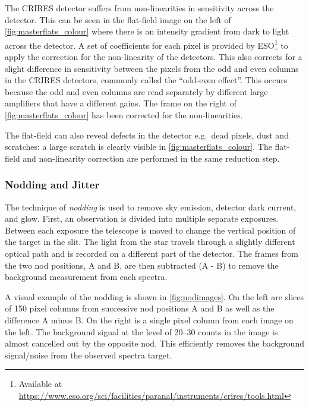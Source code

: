 The {CRIRES} detector suffers from non-linearities in sensitivity across the detector.
This can be seen in the flat-field image on the left of \cref{fig:masterflats_colour} where there is an intensity gradient from dark to light across the detector.
A set of coefficients for each pixel is provided by {ESO}\footnote{Available at \href{https://www.eso.org/sci/facilities/paranal/instruments/crires/tools.html}{https://www.eso.org/sci/facilities/paranal/instruments/crires/tools.html}} to apply the correction for the non-linearity of the detectors.
This also corrects for a slight difference in sensitivity between the pixels from the odd and even columns in the {CRIRES} detectors, commonly called the ``odd-even effect''. This occurs because the odd and even columns are read separately by different large amplifiers that have a different gains.
The frame on the right of \cref{fig:masterflats_colour} has been corrected for the non-linearities.

The flat-field can also reveal defects in the detector e.g.\ dead pixels, dust and scratches: a large scratch is clearly visible in \cref{fig:masterflats_colour}.
The flat-field and non-linearity correction are performed in the same reduction step.


\subsubsection{Nodding and Jitter}
\label{subsec:nod-jitter}
The technique of \emph{nodding} is used to remove sky emission, detector dark current, and glow.
First, an observation is divided into multiple separate exposures.
Between each exposure the telescope is moved to change the vertical position of the target in the slit.
The light from the star travels through a slightly different optical path and is recorded on a different part of the detector.
The frames from the two nod positions, A and B, are then subtracted (A - B) to remove the background measurement from each spectra.

A visual example of the nodding is shown in \cref{fig:nodimages}.
On the left are slices of 150 pixel columns from successive nod positions A and B as well as the difference A minus B.
On the right is a single pixel column from each image on the left.
The background signal at the level of 20--30 counts in the image is almost cancelled out by the opposite nod.
This efficiently removes the background signal/noise from the observed spectra target.

